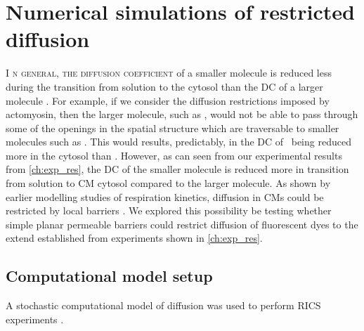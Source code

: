 \chapter{Numerical simulations of restricted diffusion}
\label{ch:comp_res}\lettrine[lines=2, lhang=0.33, loversize=0.25]{I}{
n general, the diffusion coefficient} of a smaller molecule is reduced less during the
transition from solution to the cytosol than the \ac{DC} of a larger
molecule \cite{Shorten_09_BiophysJ_96_p4764}. For example, if we consider
the diffusion restrictions imposed by actomyosin, then the larger
molecule, such as \DEX, would not be able to pass through some of the
openings in the spatial structure which are traversable to smaller molecules such as \ATP.
This would results, predictably, in the \ac{DC} of \DEX\ being reduced
more in the cytosol than \ATP. However, as can seen from our experimental
results from \ref{ch:exp_res}, the \ac{DC} of the smaller molecule is reduced more in
transition from solution to \ac{CM} cytosol compared to the larger molecule. 
As shown by earlier modelling studies of respiration kinetics, diffusion
in \acp{CM} could be restricted by local barriers
\cite{Vendelin_04_MolCellBiochem_256_p229,Ramay_09_BiophysJ_97_p443}.
We explored this possibility be testing whether simple planar
permeable barriers could restrict diffusion of fluorescent dyes to the extend established from experiments shown in \ref{ch:exp_res}. 

\section{Computational model setup}
A stochastic computational model of diffusion was used to perform
\ac{RICS} experiments \insilico.

